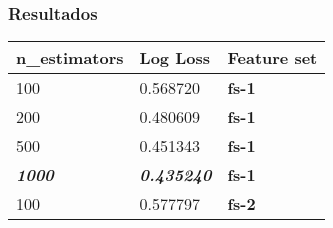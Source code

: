 \documentclass[11pt]{article}
\begin{document}
    \subsubsection{Resultados}\label{resultados}

\begin{longtable}[]{@{}lll@{}}
\toprule
n\_estimators & Log Loss & Feature set\tabularnewline
\midrule
\endhead
100 & 0.568720 & \textbf{fs-1}\tabularnewline
200 & 0.480609 & \textbf{fs-1}\tabularnewline
500 & 0.451343 & \textbf{fs-1}\tabularnewline
\textbf{\emph{1000}} & \textbf{\emph{0.435240}} &
\textbf{fs-1}\tabularnewline
100 & 0.577797 & \textbf{fs-2}\tabularnewline
\bottomrule
\end{longtable}


    
    
    
    
\end{document}
